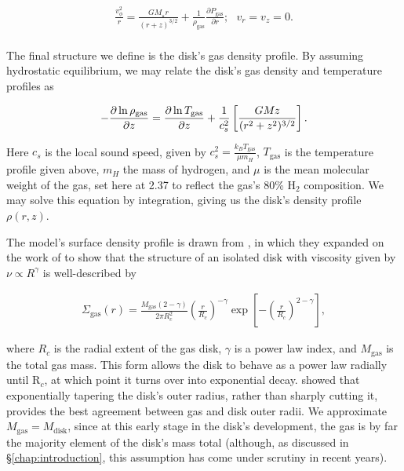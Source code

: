 \begin{align}
  \frac{v_\phi^2}{r} = \frac{GM_\star r}{(r + z)^{3/2}} + \frac{1}{\rho_\text{gas}} \frac{\partial P_\text{gas}}{\partial r}; \,\,\,\, v_r = v_z = 0. \\
\end{align}


The final structure we define is the disk's gas density profile. By assuming hydrostatic equilibrium, we may relate the disk's gas density and temperature profiles as

\begin{align}
  -\frac{\partial \ln \rho_\text{gas}}{\partial z} = \frac{\partial \ln T_\text{gas}}{\partial z} + \frac{1}{c_s^2} \left[\frac{G M_{\*} z}{(r^2 + z^2)^{3/2}} \right].
\end{align}

Here $c_s$ is the local sound speed, given by $c_s^2 = \frac{k_B T_\text{gas}}{\mu m_H}$, $T_\text{gas}$ is the temperature profile given above, $m_H$ the mass of hydrogen, and $\mu$ is the mean molecular weight of the gas, set here at 2.37 to reflect the gas's 80\% H$_2$ composition. We may solve this equation by integration, giving us the disk's density profile $\rho(r, z)$.


The model's surface density profile is drawn from \citet{Hartmann1998}, in which they expanded on the work of \citet{LyndenBell1974} to show that the structure of an isolated disk with viscosity given by $\nu \propto R^\gamma$ is well-described by



\begin{align}
  \Sigma_{\text{gas}}(r) = \frac{M_{\text{gas}} (2 - \gamma)}{2 \pi R_c^2} \left(\frac{r}{R_c} \right)^{-\gamma} \exp \left[-\left(\frac{r}{R_c} \right)^{2-\gamma} \right],
\end{align}



\noindent where $R_c$ is the radial extent of the gas disk, $\gamma$ is a power law index, and $M_\text{gas}$ is the total gas mass. This form allows the disk to behave as a power law radially until R$_c$, at which point it turns over into exponential decay. \citet{Hughes2008} showed that exponentially tapering the disk's outer radius, rather than sharply cutting it, provides the best agreement between gas and disk outer radii. We approximate $M_\text{gas} = M_\text{disk}$, since at this early stage in the disk's development, the gas is by far the majority element of the disk's mass total (although, as discussed in \S\ref{chap:introduction}, this assumption has come under scrutiny in recent years).

